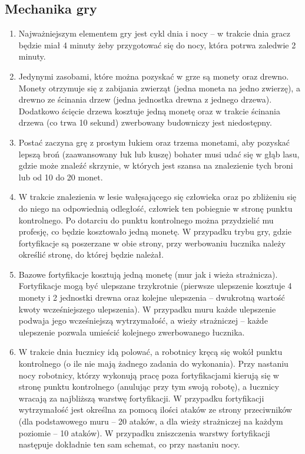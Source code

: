 \documentclass[12pt, a4paper]{article}
\begin{document}
\subsection{Mechanika gry}
\begin{enumerate}
\item Najważniejszym elementem gry jest cykl dnia i nocy -- w trakcie dnia gracz będzie miał 4 minuty żeby przygotować się do nocy, która potrwa zaledwie 2 minuty.
\item Jedynymi zasobami, które można pozyskać w grze są monety oraz drewno. Monety otrzymuje się z zabijania zwierząt (jedna moneta na jedno zwierzę), a drewno ze ścinania drzew (jedna jednostka drewna z jednego drzewa). Dodatkowo ścięcie drzewa kosztuje jedną monetę oraz w trakcie ścinania drzewa (co trwa 10 sekund) zwerbowany budowniczy jest niedostępny.
\item Postać zaczyna grę z prostym łukiem oraz trzema monetami, aby pozyskać lepszą broń (zaawansowany łuk lub kuszę) bohater musi udać się w głąb lasu, gdzie może znaleźć skrzynie, w których jest szansa na znalezienie tych broni lub od 10 do 20 monet.
\item W trakcie znalezienia w lesie wałęsającego się człowieka oraz po zbliżeniu się do niego na odpowiednią odległość, człowiek ten pobiegnie w stronę punktu kontrolnego. Po dotarciu do punktu kontrolnego można przydzielić mu profesję, co będzie kosztowało jedną monetę. W przypadku trybu gry, gdzie fortyfikacje są poszerzane w obie strony, przy werbowaniu łucznika należy określić stronę, do której będzie należał.
\item Bazowe fortyfikacje kosztują jedną monetę (mur jak i wieża strażnicza). Fortyfikacje mogą być ulepszane trzykrotnie (pierwsze ulepszenie kosztuje 4 monety i 2 jednostki drewna oraz kolejne ulepszenia -- dwukrotną wartość kwoty wcześniejszego ulepszenia). W przypadku muru każde ulepszenie podwaja jego wcześniejszą wytrzymałość, a wieży strażniczej -- każde ulepszenie pozwala umieścić kolejnego zwerbowanego łucznika.
\item W trakcie dnia łucznicy idą polować, a robotnicy kręcą się wokół punktu kontrolnego (o ile nie mają żadnego zadania do wykonania). Przy nastaniu nocy robotnicy, którzy wykonują pracę poza fortyfikacjami kierują się w stronę punktu kontrolnego (anulując przy tym swoją robotę), a łucznicy wracają za najbliższą warstwę fortyfikacji. W przypadku fortyfikacji wytrzymałość jest określna za pomocą ilości ataków ze strony przeciwników (dla podstawowego muru -- 20 ataków, a dla wieży strażniczej na każdym poziomie -- 10 ataków).
W przypadku zniszczenia warstwy fortyfikacji następuje dokładnie ten sam schemat, co przy nastaniu nocy.
\end{enumerate}
\end{document}

